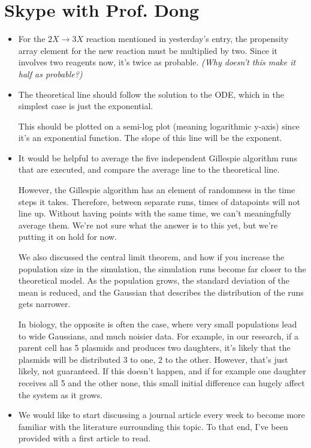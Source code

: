 \documentclass[oneside]{labbook}
\begin{document}
\section*{Skype with Prof. Dong}
\begin{itemize}
  \item For the $2X \rightarrow 3X$ reaction mentioned in yesterday's entry, the
  propensity array element for the new reaction must be multiplied by two. Since
  it involves two reagents now, it's twice as probable. \textit{(Why doesn't this
  make it half as probable?)}

  \item The theoretical line should follow the solution to the ODE, which in the
  simplest case is just the exponential.

  This should be plotted on a semi-log
  plot (meaning logarithmic y-axis) since it's an exponential function. The slope
  of this line will be the exponent.

  \item It would be helpful to average the five independent Gillespie algorithm
  runs that are executed, and compare the average line to the theoretical line.

  However, the Gillespie algorithm has an element of randomness in the time steps
  it takes. Therefore, between separate runs, times of datapoints will not line up.
  Without having points with the same time, we can't meaningfully average them.
  We're not sure what the answer is to this yet, but we're putting it on hold for now.

  We also discussed the central limit theorem, and how if you increase the population
  size in the simulation, the simulation runs become far closer to the theoretical
  model. As the population grows, the standard deviation of the mean is reduced,
  and the Gaussian that describes the distribution of the runs gets narrower.

  In biology, the opposite is often the case, where very small populations lead
  to wide Gaussians, and much noisier data. For example, in our research, if a parent
  cell has 5 plasmids and produces two daughters, it's likely that the plasmids
  will be distributed 3 to one, 2 to the other. However, that's just likely, not
  guaranteed. If this doesn't happen, and if for example one daughter receives all
  5 and the other none, this small initial difference can hugely affect the system
  as it grows.

  \item We would like to start discussing a journal article every week to become
  more familiar with the literature surrounding this topic. To that end, I've
  been provided with a first article to read\cite{thattai}.
\end{itemize}
\end{document}
